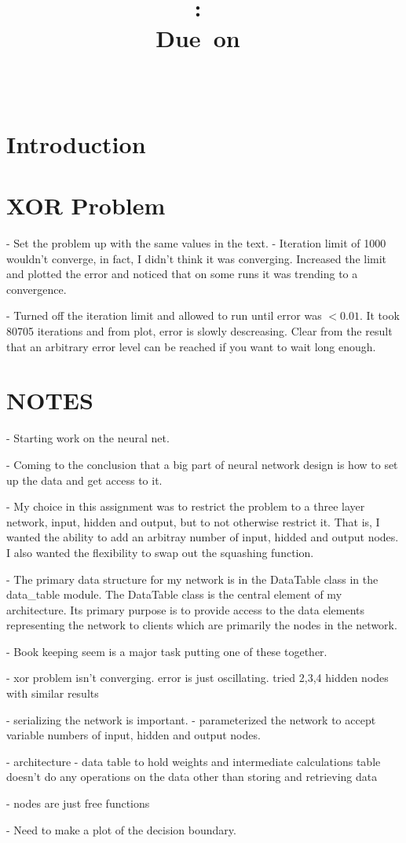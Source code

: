 \documentclass{article}
\title{\vspace{2in}\textmd{\textbf{\hmwkClass:\ \hmwkTitle\ifthenelse{\equal{\hmwkSubTitle}{}}{}{\\\hmwkSubTitle}}}\\\normalsize\vspace{0.1in}\small{Due\ on\ \hmwkDueDate}\\\vspace{0.1in}\large{\textit{\hmwkClassInstructor\ \hmwkClassTime}}\vspace{3in}}
\date{}
\author{\textbf{\hmwkAuthorName}}
\begin{document}
\maketitle

\section*{Introduction}

\section*{XOR Problem}
- Set the problem up with the same values in the text.
- Iteration limit of 1000 wouldn't converge, in fact, I didn't think
it was converging.  Increased the limit and plotted the error and
noticed that on some runs it was trending to a convergence.

- Turned off the iteration limit and allowed to run until error was
$\lt 0.01$.  It took 80705 iterations and from plot, error is slowly
descreasing.  Clear from the result that an arbitrary error level can
be reached if you want to wait long enough.

\section*{NOTES}
- Starting work on the neural net.

- Coming to the conclusion that a big part of neural network
design is how to set up the data and get access to it.

- My choice in this assignment was to restrict the problem to a
three layer network, input, hidden and output, but to not
otherwise restrict it.  That is, I wanted the ability to add
an arbitray number of input, hidded and output nodes.  I also
wanted the flexibility to swap out the squashing function.

- The primary data structure for my network is in the DataTable
class in the data_table module.  The DataTable class is the central
element of my architecture.  Its primary purpose is to provide
access to the data elements representing the network to clients
which are primarily the nodes in the network.

- Book keeping seem is a major task putting one of these together.

- xor problem isn't converging.  error is just oscillating.  tried
2,3,4 hidden nodes with similar results

- serializing the network is important.
- parameterized the network to accept variable numbers of input,
hidden and output nodes.

- architecture
  - data table to hold weights and intermediate calculations
  table doesn't do any operations on the data other than storing and
  retrieving data

  - nodes are just free functions

- Need to make a plot of the decision boundary.
\end{document}
